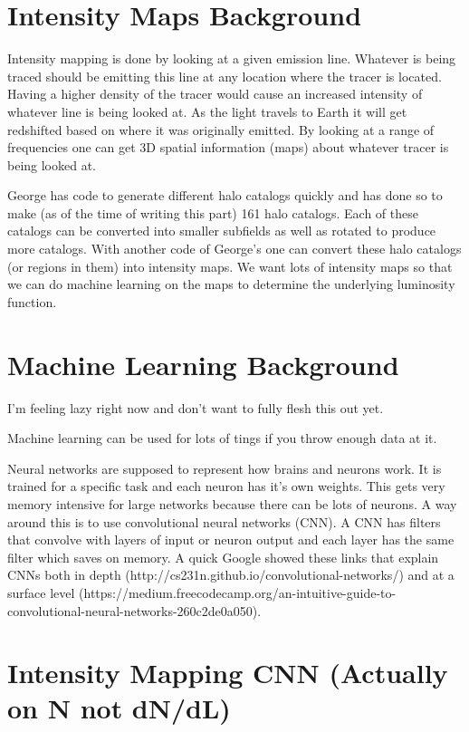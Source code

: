 \documentclass{article}
\begin{document}
	\section{Intensity Maps Background} \label{sec:IMback}

		Intensity mapping is done by looking at a given emission line.  Whatever is being traced should be emitting this line at any location where the tracer is located.  Having a higher density of the tracer would cause an increased intensity of whatever line is being looked at.  As the light travels to Earth it will get redshifted based on where it was originally emitted.  By looking at a range of frequencies one can get 3D spatial information (maps) about whatever tracer is being looked at.  

		George has code to generate different halo catalogs quickly and has done so to make (as of the time of writing this part) 161 halo catalogs.  Each of these catalogs can be converted into smaller subfields as well as rotated to produce more catalogs.  With another code of George's one can convert these halo catalogs (or regions in them) into intensity maps.  We want lots of intensity maps so that we can do machine learning on the maps to determine the underlying luminosity function.

	\section{Machine Learning Background} \label{sec:MLback}

		I'm feeling lazy right now and don't want to fully flesh this out yet.

		Machine learning can be used for lots of tings if you throw enough data at it.  

		Neural networks are supposed to represent how brains and neurons work.  It is trained for a specific task and each neuron has it's own weights.  This gets very memory intensive for large networks because there can be lots of neurons.  A way around this is to use convolutional neural networks (CNN).  A CNN has filters that convolve with layers of input or neuron output and each layer has the same filter which saves on memory.  A quick Google showed these links that explain CNNs both in depth (http://cs231n.github.io/convolutional-networks/) and at a surface level (https://medium.freecodecamp.org/an-intuitive-guide-to-convolutional-neural-networks-260c2de0a050).

	\section{Intensity Mapping CNN (Actually on N not dN/dL)} \label{sec:cnn}
\end{document}
